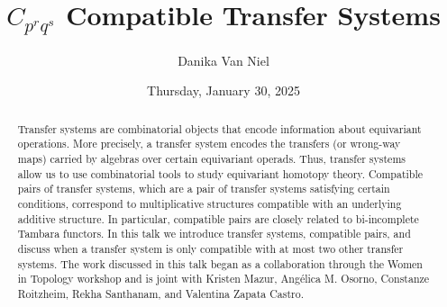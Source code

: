 \documentclass{UAmathtalk}
\author{Danika Van Niel}
\title{$C_{p^r q^s}$ Compatible Transfer Systems}
\date{Thursday, January 30, 2025}
\begin{document}
\maketitle

\begin{abstract}
Transfer systems are combinatorial objects that encode information about equivariant operations. More precisely, a transfer system encodes the transfers (or wrong-way maps) carried by algebras over certain equivariant operads. Thus, transfer systems allow us to use combinatorial tools to study equivariant homotopy theory. Compatible pairs of transfer systems, which are a pair of transfer systems satisfying certain conditions, correspond to multiplicative structures compatible with an underlying additive structure. In particular, compatible pairs are closely related to bi-incomplete Tambara functors. In this talk we introduce transfer systems, compatible pairs, and discuss when a transfer system is only compatible with at most two other transfer systems. The work discussed in this talk began as a collaboration through the Women in Topology workshop and is joint with Kristen Mazur, Angélica M. Osorno, Constanze Roitzheim, Rekha Santhanam, and Valentina Zapata Castro.
\end{abstract}
\end{document}
